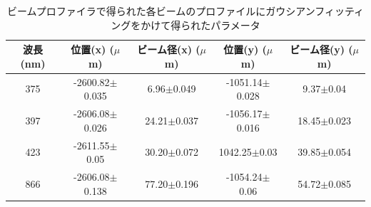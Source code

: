 \begin{table}[h]
	\begin{center}
		\caption{ビームプロファイラで得られた各ビームのプロファイルにガウシアンフィッティングをかけて得られたパラメータ}
		\label{tab:GaussianFitting}
		\begin{tabular}{c|cc|cc} \hline \hline
			波長 (nm)&位置(x) ($\mu$m)&ビーム径(x) ($\mu$m) &位置(y) ($\mu$m)& ビーム径(y) ($\mu$m)\\ \hline
			375&-2600.82$\pm$0.035&6.96$\pm$0.049&-1051.14$\pm$0.028&9.37$\pm$0.04 \\
			397&-2606.08$\pm$0.026&24.21$\pm$0.037&-1056.17$\pm$0.016&18.45$\pm$0.023 \\
			423&-2611.55$\pm$0.05&30.20$\pm$0.072&1042.25$\pm$0.03&39.85$\pm$0.054 \\
			866&-2606.08$\pm$0.138&77.20$\pm$0.196&-1054.24$\pm$0.06&54.72$\pm$0.085 \\\hline
		\end{tabular}
	\end{center}
\end{table}

\clearpage


